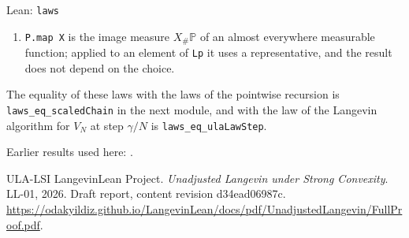 \documentclass[11pt,a4paper]{article}
\begin{document}
\begin{leanbox}{Lean: \texttt{laws}}
\begin{enumerate}
\item \texttt{P.\allowbreak{}map X} is the image measure \(X_\#\mathbb P\) of an almost everywhere measurable function; applied to an element of \texttt{Lp} it uses a representative, and the result does not depend on the choice.

\end{enumerate}



The equality of these laws with the laws of the pointwise recursion is \texttt{laws\_\allowbreak{}eq\_\allowbreak{}scaled\allowbreak{}Chain} in the next module, and with the law of the Langevin algorithm for \(V_N\) at step \(\gamma/N\) is \texttt{laws\_\allowbreak{}eq\_\allowbreak{}ula\allowbreak{}Law\allowbreak{}Step}.
\end{leanbox}


Earlier results used here: \cite[Section~3.19.1]{LangevinLean2026ULASC}.

\begin{thebibliography}{ULA-LSI}
LangevinLean Project. \emph{Unadjusted Langevin under Strong Convexity}. LL-01, 2026. Draft report, content revision d34ead06987c. \url{https://odakyildiz.github.io/LangevinLean/docs/pdf/UnadjustedLangevin/FullProof.pdf}.
\end{thebibliography}
\end{document}
